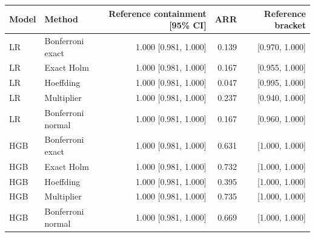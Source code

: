 \begin{tabular}{llrrr}
\toprule
Model & Method & Reference containment [95\% CI] & ARR & Reference bracket \\
\midrule
LR & Bonferroni exact & 1.000 [0.981, 1.000] & 0.139 & [0.970, 1.000] \\
LR & Exact Holm & 1.000 [0.981, 1.000] & 0.167 & [0.955, 1.000] \\
LR & Hoeffding & 1.000 [0.981, 1.000] & 0.047 & [0.995, 1.000] \\
LR & Multiplier & 1.000 [0.981, 1.000] & 0.237 & [0.940, 1.000] \\
LR & Bonferroni normal & 1.000 [0.981, 1.000] & 0.167 & [0.960, 1.000] \\
HGB & Bonferroni exact & 1.000 [0.981, 1.000] & 0.631 & [1.000, 1.000] \\
HGB & Exact Holm & 1.000 [0.981, 1.000] & 0.732 & [1.000, 1.000] \\
HGB & Hoeffding & 1.000 [0.981, 1.000] & 0.395 & [1.000, 1.000] \\
HGB & Multiplier & 1.000 [0.981, 1.000] & 0.735 & [1.000, 1.000] \\
HGB & Bonferroni normal & 1.000 [0.981, 1.000] & 0.669 & [1.000, 1.000] \\
\bottomrule
\end{tabular}
